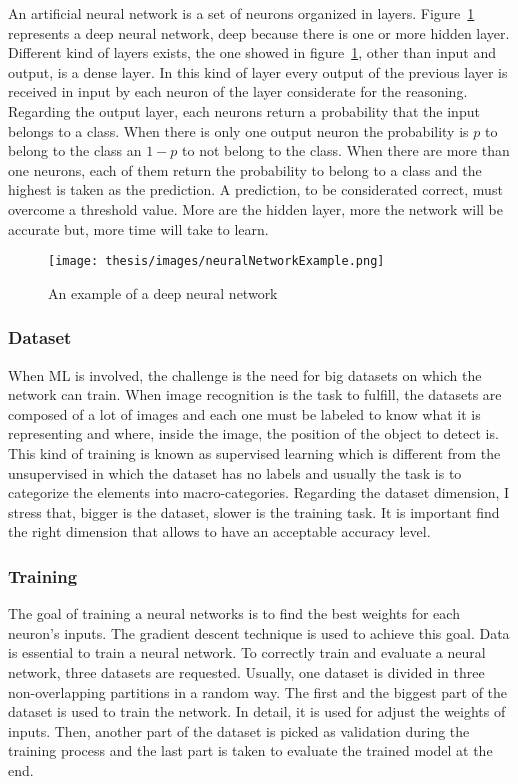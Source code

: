 \documentclass[../thesis.tex]{subfiles}
\begin{document}
An artificial neural network is a set of neurons organized in layers. Figure~\ref{fig:neural_network_example} represents a deep neural network, deep because there is one or more hidden layer. Different kind of layers exists, the one showed in figure~\ref{fig:neural_network_example}, other than input and output, is a dense layer. In this kind of layer every output of the previous layer is received in input by each neuron of the layer considerate for the reasoning. Regarding the output layer, each neurons return a probability that the input belongs to a class. When there is only one output neuron the probability is $p$ to belong to the class an $1-p$ to not belong to the class. When there are more than one neurons, each of them return the probability to belong to a class and the highest is taken as the prediction. A prediction, to be considerated correct, must overcome a threshold value. More are the hidden layer, more the network will be accurate but, more time will take to learn.

\begin{figure}[H]
    \centering
    \texttt{[image: thesis/images/neuralNetworkExample.png]}
    \caption{An example of a deep neural network}
    \label{fig:neural_network_example}
\end{figure}

\subsubsection{Dataset}
When \acrshort{ML} is involved, the challenge is the need for big datasets on which the network can train. When image recognition is the task to fulfill, the datasets are composed of a lot of images and each one must be labeled to know what it is representing and where, inside the image, the position of the object to detect is. This kind of training is known as supervised learning which is different from the unsupervised in which the dataset has no labels and usually the task is to categorize the elements into macro-categories. Regarding the dataset dimension, I stress that, bigger is the dataset, slower is the training task. It is important find the right dimension that allows to have an acceptable accuracy level.

\subsubsection{Training}
The goal of training a neural networks is to find the best weights for each neuron's inputs. The gradient descent technique is used to achieve this goal. Data is essential to train a neural network. To correctly train and evaluate a neural network, three datasets are requested. Usually, one dataset is divided in three non-overlapping partitions in a random way. The first and the biggest part of the dataset is used to train the network. In detail, it is used for adjust the weights of inputs. Then, another part of the dataset is picked as validation during the training process and the last part is taken to evaluate the trained model at the end.
\end{document}
